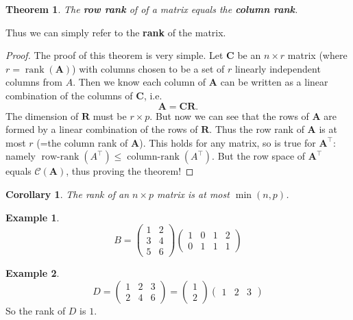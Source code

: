 \documentclass[]{book}
\newtheorem{theorem}{Theorem}[chapter]
\newtheorem{corollary}{Corollary}[chapter]
\theoremstyle{definition}
\theoremstyle{definition}
\newtheorem{example}{Example}[chapter]
\theoremstyle{definition}
\theoremstyle{remark}
\begin{document}
\begin{theorem}
\protect\hypertarget{thm:rowrank}{}{\label{thm:rowrank} }The \textbf{row rank} of of a matrix equals the \textbf{column rank}.
\end{theorem}

Thus we can simply refer to the \textbf{rank} of the matrix.

\begin{proof}
{}The proof of this theorem is very simple. Let \(\boldsymbol C\) be an \(n \times r\) matrix (where \(r=\operatorname{rank}(\boldsymbol A)\)) with columns chosen to be a set of \(r\) linearly independent columns from \(A\). Then we know each column of \(\boldsymbol A\) can be written as a linear combination of the columns of \(\boldsymbol C\), i.e.
\[\boldsymbol A= \boldsymbol C\boldsymbol R.\]
The dimension of \(\boldsymbol R\) must be \(r \times p\). But now we can see that the rows of \(\boldsymbol A\) are formed by a linear combination of the rows of \(\boldsymbol R\). Thus the row rank of \(\boldsymbol A\) is at most \(r\) (=the column rank of \(\boldsymbol A\)). This holds for any matrix, so is true for \(\boldsymbol A^\top\): namely \(\operatorname{row-rank}(A^\top)\leq \operatorname{column-rank}(A^\top)\). But the row space of \(\boldsymbol A^\top\) equals \(\mathcal{C}(\boldsymbol A)\), thus proving the theorem!
\end{proof}

\begin{corollary}
\protect\hypertarget{cor:unnamed-chunk-3}{}{\label{cor:unnamed-chunk-3} }The rank of an \(n\times p\) matrix is at most \(\min(n,p)\).
\end{corollary}

\begin{example}
\protect\hypertarget{exm:matrix1}{}{\label{exm:matrix1} }\[B = \left( \begin{array}{cccc} 1 & 2\\ 3&4 \\5&6\end{array}\right)\left(\begin{array}{cccc}1&0&1&2\\0&1&1&1\end{array}\right)
\]
\end{example}

\begin{example}
\protect\hypertarget{exm:matrix2}{}{\label{exm:matrix2} }\[ D=\left( \begin{array}{ccc} 1 & 2&3\\ 2&4&6 \end{array}\right)= \left( \begin{array}{c} 1 \\ 2 \end{array}\right)\left(\begin{array}{ccc}1&2&3\end{array}\right)
\]
So the rank of \(D\) is \(1\).
\end{example}
\end{document}
